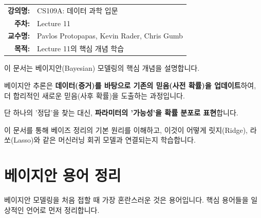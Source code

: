\documentclass[11pt,a4paper]{book}
\makeatletter
\theoremstyle{definition}
\newcommand{\metainfo}[4]{
\begin{tcolorbox}[
    colback=lightpurple,
    colframe=darkpurple,
    boxrule=1pt,
    arc=2mm,
    left=10pt,
    right=10pt,
    top=8pt,
    bottom=8pt
]
\begin{tabular}{@{}rl@{}}
\textbf{강의명:} & #1 \\[0.3em]
\textbf{주차:} & #2 \\[0.3em]
\textbf{교수명:} & #3 \\[0.3em]
\textbf{목적:} & \begin{minipage}[t]{0.75\textwidth}#4\end{minipage}
\end{tabular}
\end{tcolorbox}
}
\makeatother
\begin{document}
\metainfo{CS109A: 데이터 과학 입문}{Lecture 11}{Pavlos Protopapas, Kevin Rader, Chris Gumb}{Lecture 11의 핵심 개념 학습}




\begin{summarybox}
이 문서는 베이지안(Bayesian) 모델링의 핵심 개념을 설명합니다.

베이지안 추론은 \textbf{데이터(증거)를 바탕으로 기존의 믿음(사전 확률)을 업데이트}하여,
더 합리적인 새로운 믿음(사후 확률)을 도출하는 과정입니다.

단 하나의 '정답'을 찾는 대신, \textbf{파라미터의 '가능성'을 확률 분포로 표현}합니다.

이 문서를 통해 베이즈 정리의 기본 원리를 이해하고,
이것이 어떻게 릿지(Ridge), 라쏘(Lasso)와 같은 머신러닝 회귀 모델과 연결되는지 학습합니다.
\end{summarybox}

\section{베이지안 용어 정리}

베이지안 모델링을 처음 접할 때 가장 혼란스러운 것은 용어입니다.
핵심 용어들을 일상적인 언어로 먼저 정리합니다.
\end{document}

